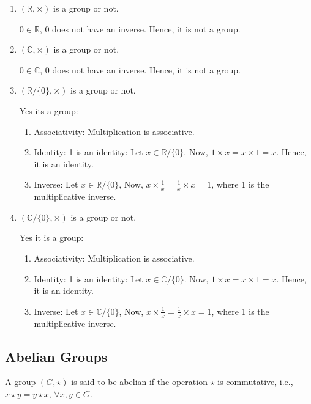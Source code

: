 \documentclass[12pt, oneside]{book}
\begin{document}
\begin{enumerate}
	\item \( \left(\mathbb{R}, \times \right)\) is a group or not.

	      \(0 \in \mathbb{R}\), \(0\) does not have an inverse. Hence, it is not a group.

	\item \(\left(\mathbb{C}, \times\right)\) is a group or not.

	      \(0 \in \mathbb{C}\), \(0\) does not have an inverse. Hence, it is not a group.

	\item \(\left(\mathbb{R}/\{0\}, \times \right)\) is a group or not.

	      Yes its a group:
	      \begin{enumerate}
		      \item Associativity: Multiplication is associative.
		      \item Identity: 1 is an identity:
		            Let \(x \in \mathbb{R}/\{0\} \). Now, \(1 \times x = x \times 1 = x\). Hence, it is an identity.
		      \item Inverse: Let \(x \in \mathbb{R}/\{0\} \), Now, \(x \times \frac{1}{x} = \frac{1}{x} \times x = 1\), where 1 is the multiplicative inverse.
	      \end{enumerate}

	\item \(\left(\mathbb{C}/\{0\}, \times \right)\) is a group or not.

	      Yes it is a group:
	      \begin{enumerate}
		      \item Associativity: Multiplication is associative.
		      \item Identity: 1 is an identity:
		            Let \(x \in \mathbb{C}/\{0\} \). Now, \(1 \times x = x \times 1 = x\). Hence, it is an identity.
		      \item Inverse: Let \(x \in \mathbb{C}/\{0\} \), Now, \(x \times \frac{1}{x} = \frac{1}{x} \times x = 1\), where 1 is the multiplicative inverse.
	      \end{enumerate}
\end{enumerate}
\subsection{Abelian Groups}
A group \( \left(G, \star \right) \) is said to be abelian if the operation \(\star\) is commutative, i.e., \(x \star y = y \star x\), \(\forall x,y \in G\).
\end{document}
